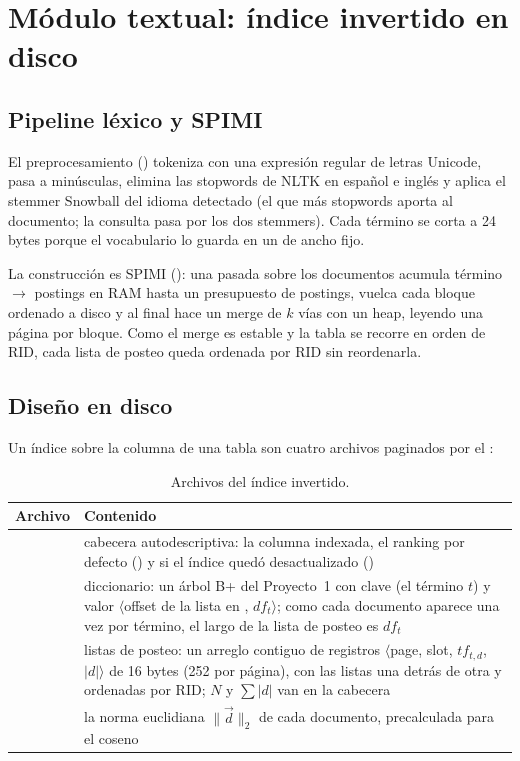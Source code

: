 \section{Módulo textual: índice invertido en disco}
\label{sec:textual}

\subsection{Pipeline léxico y SPIMI}

El preprocesamiento () tokeniza con una expresión
regular de letras Unicode, pasa a minúsculas, elimina las stopwords de NLTK en
español e inglés y aplica el stemmer Snowball del idioma detectado (el que más
stopwords aporta al documento; la consulta pasa por los dos stemmers). Cada término
se corta a 24 bytes porque el vocabulario lo guarda en un  de ancho fijo.

La construcción es SPIMI (): una pasada sobre los documentos acumula
término $\to$ postings en RAM hasta un presupuesto de postings, vuelca cada bloque
ordenado a disco y al final hace un merge de $k$ vías con un heap, leyendo una
página por bloque. Como el merge es estable y la tabla se recorre en orden de RID,
cada lista de posteo queda ordenada por RID sin reordenarla.

\subsection{Diseño en disco}

Un índice  sobre la columna de una tabla son cuatro archivos paginados
por el :

\begin{table}[H]
\centering\small
\begin{tabularx}{\textwidth}{lY}
\toprule
Archivo & Contenido \\
\midrule
{} & cabecera autodescriptiva: la columna indexada, el ranking por defecto () y si el índice quedó desactualizado () \\
 & diccionario: un árbol B+ del Proyecto~1 con clave  (el término $t$) y valor $\langle$offset de la lista en , $df_t\rangle$; como cada documento aparece una vez por término, el largo de la lista de posteo es $df_t$ \\
 & listas de posteo: un arreglo contiguo de registros $\langle$page, slot, $tf_{t,d}$, $|d|\rangle$ de 16 bytes (252 por página), con las listas una detrás de otra y ordenadas por RID; $N$ y $\sum|d|$ van en la cabecera \\
 & la norma euclidiana $\|\vec d\|_2$ de cada documento, precalculada para el coseno \\
\bottomrule
\end{tabularx}
\caption{Archivos del índice invertido.}
\end{table}

